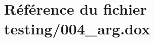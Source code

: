 \hypertarget{004__arg_8dox}{}\section{Référence du fichier testing/004\+\_\+arg.dox}
\label{004__arg_8dox}
